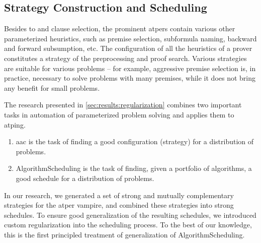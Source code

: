 \subsection{Strategy Construction and Scheduling}

Besides \gls{to} and clause selection, the prominent \glspl{atper} contain various other parameterized heuristics,
such as premise selection, subformula naming, backward and forward subsumption, etc.
The configuration of all the heuristics of a prover constitutes a strategy of the preprocessing and proof search.
Various strategies are suitable for various problems -- for example, aggressive premise selection is, in practice, necessary to solve problems with many premises, while it does not bring any benefit for small problems.

The research presented in \cref{sec:results:regularization} combines two important tasks in automation of parameterized problem solving and applies them to \gls{atping}.
\begin{enumerate}
\item \Gls{aac} is the task of finding a good configuration (strategy) for a distribution of problems.
\item \Gls{AlgorithmScheduling} is the task of finding, given a portfolio of algorithms, a good schedule for a distribution of problems.
\end{enumerate}
In our research, we generated a set of strong and mutually complementary strategies for the \gls{atper} \gls{vampire},
and combined these strategies into strong schedules.
To ensure good generalization of the resulting schedules, we introduced custom regularization into the scheduling process.
To the best of our knowledge, this is the first principled treatment of generalization of \gls{AlgorithmScheduling}.
